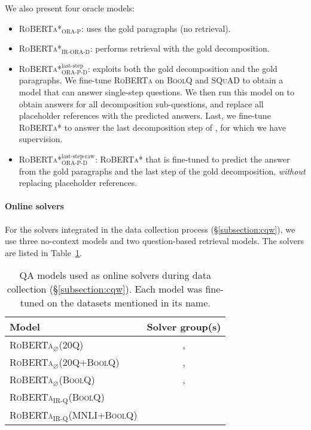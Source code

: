 {We also present four oracle models: 
\begin{itemize}[leftmargin=*,topsep=0pt,itemsep=0pt,parsep=0pt]
    
    \item \textsc{RoBERTa*$_\text{ORA-P}$}: uses the gold paragraphs (no retrieval).
    
    \item \textsc{RoBERTa*$_\text{IR-ORA-D}$}: performs retrieval with the gold decomposition.
    
    \item \textsc{RoBERTa*}$^{\text{last-step}}_\text{ORA-P-D}$: exploits both the gold decomposition and the gold paragraphs. We fine-tune \textsc{RoBERTa} on \textsc{BoolQ} and \textsc{SQuAD} \cite{rajpurkar2016squad} to obtain a model that can answer single-step questions. We then run this model on \strategyqa{} to obtain answers for all decomposition sub-questions, and replace all placeholder references with the predicted answers. Last, we fine-tune \textsc{RoBERTa*} to answer the last decomposition step of \strategyqa{}, for which we have supervision. 
    
    \item \textsc{RoBERTa*}$^{\text{last-step-raw}}_\text{ORA-P-D}$: \textsc{RoBERTa*} that is fine-tuned to predict the answer from the gold paragraphs and the last step of the gold decomposition, \emph{without} replacing placeholder references.

\end{itemize} 

\paragraph{Online solvers}
For the solvers integrated in the data collection process (\S\ref{subsection:cqw}), we use three no-context models and two question-based retrieval models. The solvers are listed in Table~\ref{table:baseline_models}.

\begin{table}[t]
    \centering
    \footnotesize
    \begin{tabular}{p{4.4cm}c}
      Model  & Solver group(s) \\ \hline
      \textsc{RoBERTa$_\varnothing$(20Q)}  &  \ckptzero{}, \fntd{} \\
      \textsc{RoBERTa$_\varnothing$(20Q+BoolQ)}  & \ckptzero{}, \fntd{} \\
      \textsc{RoBERTa$_\varnothing$(BoolQ)}  &  \ckptzero{}, \fntd{} \\
      \textsc{RoBERTa$_{\text{IR-Q}}$(BoolQ)}  & \ckptzero{} \\
      \textsc{RoBERTa$_{\text{IR-Q}}$(MNLI+BoolQ)}  & \ckptzero{} 
    \end{tabular}
    \caption{QA models used as online solvers during data collection (\S\ref{subsection:cqw}).
    Each model was fine-tuned on the datasets mentioned in its name.
    }
    \label{table:baseline_models}
\end{table}

}
